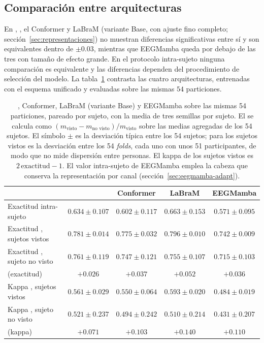 \subsection{Comparación entre arquitecturas}
\label{sec:comparacion}

En \loso{}, \eegnet{}, el Conformer y LaBraM \cite{jiang2024labram} (variante Base, con ajuste fino
completo; sección~\ref{sec:representaciones}) no muestran diferencias significativas entre sí y son
equivalentes dentro de $\pm 0.03$, mientras que EEGMamba queda por debajo de las tres con tamaño de
efecto grande. En el protocolo intra-sujeto ninguna comparación es equivalente y las diferencias
dependen del procedimiento de selección del modelo. La tabla~\ref{tab:conformer} contrasta las
cuatro arquitecturas, entrenadas con el esquema unificado y evaluadas sobre las mismas $54$
particiones.

\begin{table}[H]
\centering
\caption{\eegnet{}, Conformer, LaBraM (variante Base) y EEGMamba sobre las mismas 54
particiones, pareado por sujeto, con la media de tres semillas por sujeto. El \dsi{} se calcula como
$(m_{\text{visto}} - m_{\text{no visto}})/m_{\text{visto}}$ sobre las medias
agregadas de los 54 sujetos. El símbolo
$\pm$ es la desviación típica entre los 54 sujetos; para los sujetos vistos es la
desviación entre los 54 \textit{folds}, cada uno con unos 51 participantes, de modo
que no mide dispersión entre personas. El kappa de los sujetos vistos es $2\,\mathrm{exactitud} - 1$.
El valor intra-sujeto de EEGMamba emplea la cabeza que conserva la representación por
canal (sección~\ref{sec:eegmamba-adapt}).}
\label{tab:conformer}
\footnotesize
\setlength{\tabcolsep}{3pt}
\begin{tabular}{lcccc}
\toprule
 & \textbf{\eegnet{}} & \textbf{Conformer} & \textbf{LaBraM} & \textbf{EEGMamba} \\
\midrule
Exactitud intra-sujeto & $0.634 \pm 0.107$ & $0.602 \pm 0.117$ & $0.663 \pm 0.153$ & $0.571 \pm 0.095$ \\
\midrule
Exactitud \loso{}, sujetos vistos & $0.781 \pm 0.014$ & $0.775 \pm 0.032$ & $0.796 \pm 0.010$ & $0.742 \pm 0.009$ \\
Exactitud \loso{}, sujeto no visto & $0.761 \pm 0.119$ & $0.747 \pm 0.121$ & $0.755 \pm 0.107$ & $0.715 \pm 0.103$ \\
\dsi{} (exactitud) & $+0.026$ & $+0.037$ & $+0.052$ & $+0.036$ \\
\midrule
Kappa \loso{}, sujetos vistos & $0.561 \pm 0.029$ & $0.550 \pm 0.064$ & $0.593 \pm 0.020$ & $0.484 \pm 0.019$ \\
Kappa \loso{}, sujeto no visto & $0.521 \pm 0.237$ & $0.494 \pm 0.242$ & $0.510 \pm 0.214$ & $0.431 \pm 0.207$ \\
\dsi{} (kappa) & $+0.071$ & $+0.103$ & $+0.140$ & $+0.110$ \\
\bottomrule
\end{tabular}
\end{table}


